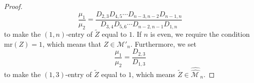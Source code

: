 \documentclass[11pt]{amsart}
\theoremstyle{plain}
\theoremstyle{definition}
\theoremstyle{remark}
\begin{document}
\begin{proof}
\begin{equation}
    \frac{\mu_1}{\mu_2} = \frac{D_{2,3} D_{4,5} \cdots D_{n-3,n-2}D_{n-1,n}}{D_{3,4} D_{5,6} \cdots D_{n-2,n-1} D_{1,n}}
\end{equation}
to make the $(1,n)$-entry of $\widetilde{Z}$ equal to $1$.
If $n$ is even, we require the condition $\mathrm{mr}(Z)=1$, which means that
$Z \in \mathcal{M}'_n$. Furthermore, we set
\begin{equation}
    \frac{\mu_1}{\mu_2} = \frac{D_{2,3}}{D_{1,3}}
\end{equation}
to make the $(1,3)$-entry of $\widetilde{Z}$ equal to $1$, which means
$\widetilde{Z} \in \widehat{\widehat{\mathcal{M\,}}}_{n}$.




\end{proof}
\end{document}
